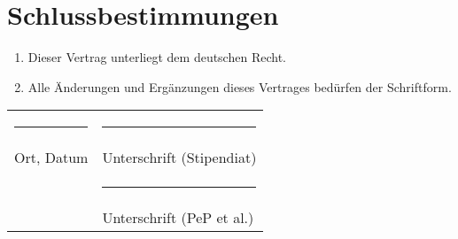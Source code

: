 \documentclass[
  paper=a4,
  fontsize=12pt,
  DIV=16,
  parskip=full,
  headinclude=true,
]{scrartcl}
\begin{document}
\section{Schlussbestimmungen}

\begin{enumerate}[\qquad(1)]
	\item Dieser Vertrag unterliegt dem deutschen Recht.
	\item Alle Änderungen und Ergänzungen dieses Vertrages bedürfen der
		Schriftform.
\end{enumerate}

\vspace{2cm}
\begin{tabular}{@{}p{}@{}p{}@{}}%
\rule{6cm}{1pt} & \rule{7cm}{1pt} \\
Ort, Datum & Unterschrift (Stipendiat)\\[2cm]
 & \rule{7cm}{1pt} \\
 & Unterschrift (PeP et al.)
\end{tabular}
\end{document}
